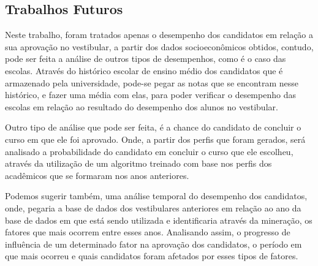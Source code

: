 \subsection{Trabalhos Futuros}

\par
Neste trabalho, foram tratados apenas o desempenho dos candidatos em relação a sua aprovação no vestibular, a partir dos dados socioeconômicos obtidos, contudo, pode ser feita a análise de outros tipos de desempenhos, como é o caso das escolas. Através do histórico escolar de ensino médio dos candidatos que é armazenado pela universidade, pode-se pegar as notas que se encontram nesse histórico, e fazer uma média com elas, para poder verificar o desempenho das escolas em relação ao resultado do desempenho dos alunos no vestibular. 

\par
Outro tipo de análise que pode ser feita, é a chance do candidato de concluir o curso em que ele foi aprovado. Onde, a partir dos perfis que foram gerados, será analisado a probabilidade do candidato em concluir o curso que ele escolheu, através da utilização de um algoritmo treinado com base nos perfis dos acadêmicos que se formaram nos anos anteriores.

\par
Podemos sugerir também, uma análise temporal do desempenho dos candidatos, onde, pegaria a base de dados dos vestibulares anteriores em relação ao ano da base de dados em que está sendo utilizada e identificaria através da mineração, os fatores que mais ocorrem entre esses anos. Analisando assim, o progresso de influência de um determinado fator na aprovação dos candidatos, o período em que mais ocorreu e quais candidatos foram afetados por esses tipos de fatores.
